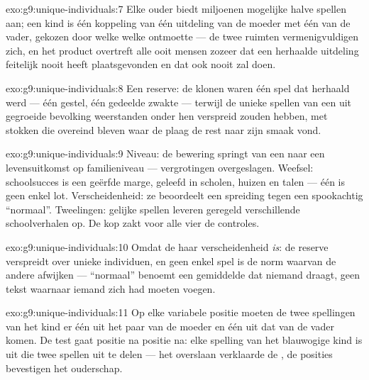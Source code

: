 \begin{solution}{exo:g9:unique-individuals:7}
Elke ouder biedt miljoenen mogelijke halve spellen aan; een kind
is één koppeling van één uitdeling van de moeder met één van de
vader, gekozen door welke  welke ontmoette --- de twee
ruimten vermenigvuldigen zich, en het product overtreft alle ooit
 mensen zozeer dat een herhaalde uitdeling feitelijk nooit
heeft plaatsgevonden en dat ook nooit zal doen.
\end{solution}

\begin{solution}{exo:g9:unique-individuals:8}
Een reserve: de klonen waren één spel dat herhaald werd --- één
gestel, één gedeelde zwakte --- terwijl de unieke spellen van een
uit  gegroeide bevolking weerstanden onder hen verspreid
zouden hebben, met stokken die overeind bleven waar de plaag de
rest naar zijn smaak vond.
\end{solution}

\begin{solution}{exo:g9:unique-individuals:9}
Niveau: de bewering springt van een  naar een levensuitkomst op
familieniveau --- vergrotingen overgeslagen. Weefsel: schoolsucces
is een geërfde marge, geleefd in scholen, huizen en talen --- één
 is geen enkel lot. Verscheidenheid: ze beoordeelt een
spreiding tegen een spookachtig ``normaal''. Tweelingen: gelijke
spellen leveren geregeld verschillende schoolverhalen op. De kop
zakt voor alle vier de controles.
\end{solution}

\begin{solution}{exo:g9:unique-individuals:10}
Omdat de  haar verscheidenheid \emph{is}: de reserve
verspreidt  over unieke individuen, en geen enkel spel is
de norm waarvan de andere afwijken --- ``normaal'' benoemt een
gemiddelde dat niemand draagt, geen tekst waarnaar iemand zich
had moeten voegen.
\end{solution}

\begin{solution}{exo:g9:unique-individuals:11}
Op elke variabele positie moeten de twee spellingen van het kind
er één uit het paar van de moeder en één uit dat van de vader
komen. De test gaat positie na positie na: elke spelling van het
blauwogige kind is uit die twee spellen uit te delen --- het
overslaan verklaarde de , de posities bevestigen het
ouderschap.
\end{solution}

